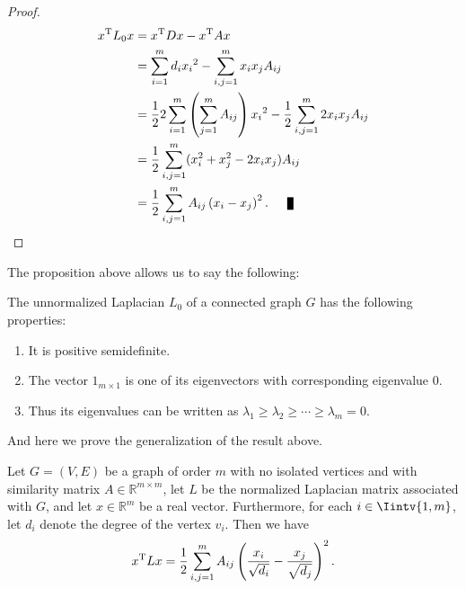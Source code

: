 \begin{proof}
   \begin{equation*} 
      \begin{split}
         x^{\rm T}L_0x &= x^{\rm T}Dx - x^{\rm T}Ax \\
         &= \sum_{i=1}^m d_i{x_i}^2 - \sum_{i,j = 1}^m x_i  x_j A_{ij}  \\
         &= \frac{1}{2} 2 \sum_{i=1}^m \left( \sum_{j=1}^mA_{ij} \right){x_i}^2 - \frac{1}{2}\sum_{i,j = 1}^m 2x_i  x_j A_{ij}  \\
         &= \frac{1}{2} \sum_{i,j=1}^m (x_i^2 +x_j^2 - 2x_ix_j)A_{ij} \\
         &= \frac{1}{2} \sum_{i,j=1}^m A_{ij} \left( x_i - x_j \right) ^2. \qed
      \end{split}
   \end{equation*}
\end{proof}

The proposition above allows us to say the following:

\begin{corollary}\label{unnormalizedLaplacianProperties}
   The unnormalized Laplacian $L_0$ of a connected graph $G$ has the following properties:
   \begin{enumerate}
      \item It is positive semidefinite.
      \item The vector $1_{m \times 1}$ is one of its eigenvectors with corresponding eigenvalue $0$.
      \item Thus its eigenvalues can be written as $\lambda_1 \ge \lambda_2 \ge \cdots \ge \lambda_m = 0$.
   \end{enumerate}
\end{corollary}

And here we prove the generalization of the result above.

\begin{proposition}\label{xtlx2}
   Let $G = (V,E)$ be a graph of order $m$ with no isolated vertices and with similarity matrix $A \in \mathbb R^{m \times m}$, let $L$ be the normalized Laplacian matrix associated with $G$, and let $x \in \mathbb R^{m} $ be a real vector. Furthermore, for each $i \in \Iintv{1,m}$, let $d_i$ denote the degree of the vertex $v_i$. Then we have
   \begin{equation}
      x^{\rm T}Lx = \frac{1}{2}\sum_{i,j = 1}^m A_{ij} \left( \frac{x_i}{\sqrt{d_i}} - \frac{x_j}{\sqrt{d_j}} \right)^2.
   \end{equation}
\end{proposition}

